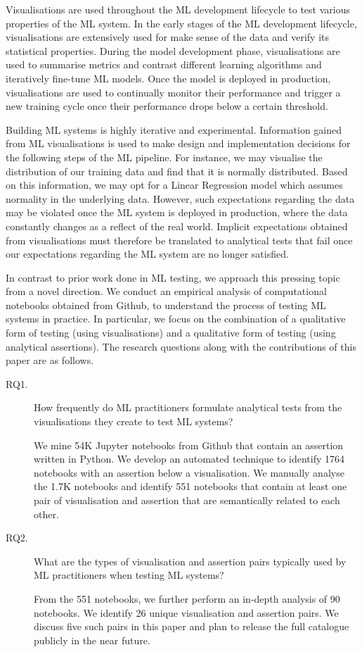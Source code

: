 \documentclass[acmsmall,screen,review,anonymous]{acmart}
\begin{document}
Visualisations are used throughout the ML development lifecycle to test various properties of the ML system. In the early stages of the ML development lifecycle, visualisations are extensively used for make sense of the data and verify its statistical properties. During the model development phase, visualisations are used to summarise metrics and contrast different learning algorithms and iteratively fine-tune ML models. Once the model is deployed in production, visualisations are used to continually monitor their performance and trigger a new training cycle once their performance drops below a certain threshold.

Building ML systems is highly iterative and experimental. Information gained from ML visualisations is used to make design and implementation decisions for the following steps of the ML pipeline. For instance, we may visualise the distribution of our training data and find that it is normally distributed. Based on this information, we may opt for a Linear Regression model which assumes normality in the underlying data. However, such expectations regarding the data may be violated once the ML system is deployed in production, where the data constantly changes as a reflect of the real world. Implicit expectations obtained from visualisations must therefore be translated to analytical tests that fail once our expectations regarding the ML system are no longer satisfied.

In contrast to prior work done in ML testing, we approach this pressing topic from a novel direction. We conduct an empirical analysis of computational notebooks obtained from Github, to understand the process of testing ML systems in practice. In particular, we focus on the combination of a qualitative form of testing (using visualisations) and a qualitative form of testing (using analytical assertions). The research questions along with the contributions of this paper are as follows.

\begin{description}
\item[RQ1.] How frequently do ML practitioners formulate analytical tests from the visualisations they create to test ML systems?

We mine 54K Jupyter notebooks from Github that contain an assertion written in Python. We develop an automated technique to identify 1764 notebooks with an assertion below a visualisation. We manually analyse the 1.7K notebooks and identify 551 notebooks that contain at least one pair of visualisation and assertion that are semantically related to each other.

\item[RQ2.] What are the types of visualisation and assertion pairs typically used by ML practitioners when testing ML systems?

From the 551 notebooks, we further perform an in-depth analysis of 90 notebooks. We identify 26 unique visualisation and assertion pairs. We discuss five such pairs in this paper and plan to release the full catalogue publicly in the near future.

\end{description}
\end{document}
